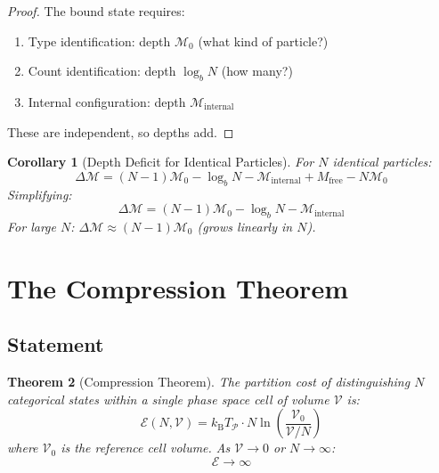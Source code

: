 \documentclass[twocolumn,10pt,a4paper]{article}
\newtheorem{theorem}{Theorem}[section]
\newtheorem{corollary}[theorem]{Corollary}
\theoremstyle{definition}
\theoremstyle{remark}
\newcommand{\kB}{k_{\mathrm{B}}}
\newcommand{\Partition}{\mathcal{P}}
\newcommand{\Depth}{\mathcal{M}}
\newcommand{\Cost}{\mathcal{E}}
\newcommand{\Mfree}{M_{\mathrm{free}}}
\begin{document}
\begin{proof}
The bound state requires:
\begin{enumerate}
    \item Type identification: depth $\Depth_0$ (what kind of particle?)
    \item Count identification: depth $\log_b N$ (how many?)
    \item Internal configuration: depth $\Depth_{\text{internal}}$
\end{enumerate}
These are independent, so depths add.
\end{proof}

\begin{corollary}[Depth Deficit for Identical Particles]
\label{cor:identical_deficit}
For $N$ identical particles:
\begin{equation}
    \Delta\Depth = (N-1)\Depth_0 - \log_b N - \Depth_{\text{internal}} + \Mfree - N\Depth_0
\end{equation}
Simplifying:
\begin{equation}
    \Delta\Depth = (N-1)\Depth_0 - \log_b N - \Depth_{\text{internal}}
\end{equation}
For large $N$: $\Delta\Depth \approx (N-1)\Depth_0$ (grows linearly in $N$).
\end{corollary}

\section{The Compression Theorem}
\label{sec:compression}

\subsection{Statement}

\begin{theorem}[Compression Theorem]
\label{thm:compression}
The partition cost of distinguishing $N$ categorical states within a single phase space cell of volume $\mathcal{V}$ is:
\begin{equation}
    \Cost(N, \mathcal{V}) = \kB T_{\Partition} \cdot N \ln\left(\frac{\mathcal{V}_0}{\mathcal{V}/N}\right)
\end{equation}
where $\mathcal{V}_0$ is the reference cell volume. As $\mathcal{V} \to 0$ or $N \to \infty$:
\begin{equation}
    \Cost \to \infty
\end{equation}
\end{theorem}
\end{document}
